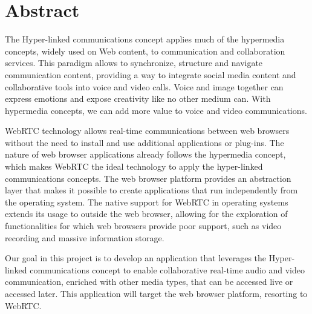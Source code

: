 \chapter*{Abstract}


The Hyper-linked communications concept applies much of the hypermedia concepts, widely used on Web content, to communication and collaboration services. This paradigm allows to synchronize, structure and navigate communication content, providing a way to integrate social media content and collaborative tools into voice and video calls.
Voice and image together can express emotions and expose creativity like no other medium can. With hypermedia concepts, we can add more value to voice and video communications.

\ac{WebRTC} technology allows real-time communications between web browsers without the need to install and use additional applications or plug-ins. The nature of web browser applications already follows the hypermedia concept, which makes \ac{WebRTC} the ideal technology to apply the hyper-linked communications concepts.
{\color{blue}The web browser platform provides an abstraction layer that makes it possible to create applications that run independently from the operating system.}
The native support for \ac{WebRTC} in operating systems extends its usage to outside the web browser, allowing for the exploration of functionalities for which web browsers provide poor support, such as video recording and massive information storage.

Our goal in this project is to develop an application that leverages the Hyper-linked communications concept to enable collaborative real-time audio and video communication, enriched with other media types, that can be accessed live or accessed later.
This application will target the web browser platform, resorting to \ac{WebRTC}.



